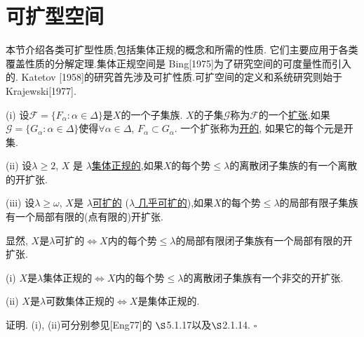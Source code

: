 \documentclass[main.tex]{subfiles}
\begin{document}
\section{可扩型空间}\label{ch1.3}
本节介绍各类可扩型性质,包括集体正规的概念和所需的性质.
它们主要应用于各类覆盖性质的分解定理.集体正规空间是 Bing[1975]为了研究空间的可度量性而引入的. Katetov [1958]的研究首先涉及可扩性质.可扩空间的定义和系统研究则始于
Krajewski[1977].

\begin{definition}
	\textnormal{(i)} 设$\mathscr{F}=\{F_\alpha:\alpha\in\Delta\}$是$X$的一个子集族.
	$X$的子集$\mathscr{G}$称为$\mathscr{F}$的一个\underline{扩张},如果
	$\mathscr{G}=\{G_\alpha:\alpha\in\Delta\}$使得$\forall\alpha\in\Delta$, $F_\alpha\subset G_\alpha$. 一个扩张称为\underline{开的}, 如果它的每个元是开集.
	
	\textnormal{(ii)} 设$\lambda\ge 2$, $X$ 是 \underline{$\lambda$集体正规的},如果$X$的每个势$\le\lambda$的离散闭子集族的有一个离散的开扩张.
	
	\textnormal{(iii)} 设$\lambda\ge \omega$, $X$是 \underline{$\lambda$可扩的}
	\textnormal{(}\underline{$\lambda$ 几乎可扩的}\textnormal{)},如果$X$的每个势$\le\lambda$的局部有限子集族有一个局部有限的\textnormal{(}点有限的\textnormal{)}开扩张.
\end{definition}

\begin{note}
	显然, $X$是$\lambda$可扩的$\Leftrightarrow X$内的每个势$\le\lambda$的局部有限闭子集族有一个局部有限的开扩张.
\end{note}

\begin{fact}
	\textnormal{(i)} 	$X$是$\lambda$集体正规的$\Leftrightarrow X$内的每个势$\le\lambda$的离散闭子集族有一个非交的开扩张.
	
	\textnormal{(ii)} $X$是$\lambda$可数集体正规的$\Leftrightarrow X$是集体正规的.
\end{fact}

证明. (i), (ii)可分别参见[Eng77]的 $\S$5.1.17以及$\S$2.1.14. $\square$
\end{document}
